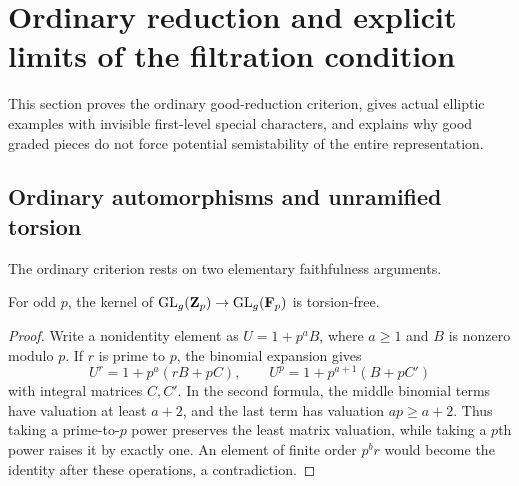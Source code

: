 \section{Ordinary reduction and explicit limits of the filtration condition}\label{sec:early-reduction}
This section proves the ordinary good-reduction criterion, gives actual elliptic examples with invisible first-level special characters, and explains why good graded pieces do not force potential semistability of the entire representation.

\subsection{Ordinary automorphisms and unramified torsion}
The ordinary criterion rests on two elementary faithfulness arguments.

\begin{lemma}\label{lem:principal-congruence-torsion}
For odd $p$, the kernel of $\operatorname{GL}_g(\mathbf Z_p)\to\operatorname{GL}_g(\mathbf F_p)$ is torsion-free.
\end{lemma}
\begin{proof}
Write a nonidentity element as $U=1+p^aB$, where $a\ge1$ and $B$ is nonzero modulo $p$. If $r$ is prime to $p$, the binomial expansion gives
\[
 U^r=1+p^a(rB+pC),\qquad
 U^p=1+p^{a+1}(B+pC')
\]
with integral matrices $C,C'$. In the second formula, the middle binomial terms have valuation at least $a+2$, and the last term has valuation $ap\ge a+2$. Thus taking a prime-to-$p$ power preserves the least matrix valuation, while taking a $p$th power raises it by exactly one. An element of finite order $p^br$ would become the identity after these operations, a contradiction.
\end{proof}

